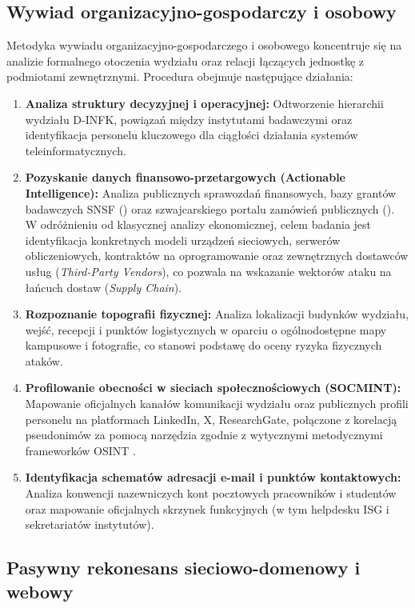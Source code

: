 \subsection{Wywiad organizacyjno-gospodarczy i osobowy}\label{subsec:metodyka-korp-osobowa}

Metodyka wywiadu organizacyjno-gospodarczego i osobowego koncentruje się na analizie formalnego otoczenia wydziału oraz relacji łączących jednostkę z podmiotami zewnętrznymi. Procedura obejmuje następujące działania:
\begin{enumerate}
    \item \textbf{Analiza struktury decyzyjnej i operacyjnej:} Odtworzenie hierarchii wydziału D-INFK, powiązań między instytutami badawczymi oraz identyfikacja personelu kluczowego dla ciągłości działania systemów teleinformatycznych.
    \item \textbf{Pozyskanie danych finansowo-przetargowych (Actionable Intelligence):} Analiza publicznych sprawozdań finansowych, bazy grantów badawczych SNSF () oraz szwajcarskiego portalu zamówień publicznych (). W odróżnieniu od klasycznej analizy ekonomicznej, celem badania jest identyfikacja konkretnych modeli urządzeń sieciowych, serwerów obliczeniowych, kontraktów na oprogramowanie oraz zewnętrznych dostawców usług (\textit{Third-Party Vendors}), co pozwala na wskazanie wektorów ataku na łańcuch dostaw (\textit{Supply Chain}).
    \item \textbf{Rozpoznanie topografii fizycznej:} Analiza lokalizacji budynków wydziału, wejść, recepcji i punktów logistycznych w oparciu o ogólnodostępne mapy kampusowe i fotografie, co stanowi podstawę do oceny ryzyka fizycznych ataków.
    \item \textbf{Profilowanie obecności w sieciach społecznościowych (SOCMINT):} Mapowanie oficjalnych kanałów komunikacji wydziału oraz publicznych profili personelu na platformach LinkedIn, X, ResearchGate, połączone z korelacją pseudonimów za pomocą narzędzia  zgodnie z wytycznymi metodycznymi frameworków OSINT \cite{osintframework_com,whatsmyname_app}.
    \item \textbf{Identyfikacja schematów adresacji e-mail i punktów kontaktowych:} Analiza konwencji nazewniczych kont pocztowych pracowników i studentów oraz mapowanie oficjalnych skrzynek funkcyjnych (w tym helpdesku ISG i sekretariatów instytutów).
\end{enumerate}

\subsection{Pasywny rekonesans sieciowo-domenowy i webowy}\label{subsec:metodyka-sieciowo-webowa}

